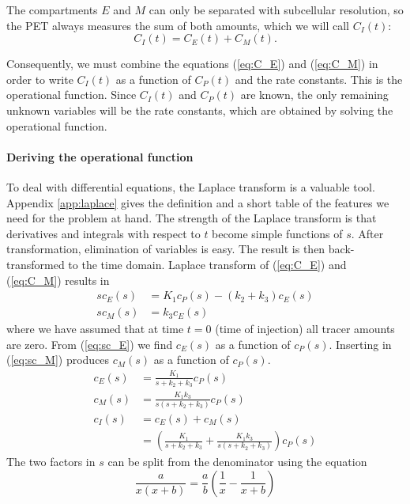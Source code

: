 \documentclass[11pt,oneside]{article}
\begin{document}
The compartments $E$ and $M$ can only be separated with subcellular
resolution, so the PET always measures the sum of both amounts, which we will
call $C_I(t)$:
\begin{equation}
  C_I(t) = C_E(t) + C_M(t).
\end{equation}

Consequently, we must combine the equations (\ref{eq:C_E}) and (\ref{eq:C_M})
in order to write $C_I(t)$ as a function of $C_P(t)$ and the rate
constants. This is the operational function. Since $C_I(t)$ and $C_P(t)$ are
known, the only remaining unknown variables will be the rate constants, which
are obtained by solving the operational function.

\paragraph{Deriving the operational function\\}
To deal with differential equations, the Laplace transform is a valuable
tool. Appendix \ref{app:laplace} gives the definition and a short table of the
features we need for the problem at hand. The strength of the Laplace
transform is that derivatives and integrals with respect to $t$ become simple
functions of $s$. After transformation, elimination of variables is easy. The
result is then back-transformed to the time domain.  Laplace transform of
(\ref{eq:C_E}) and (\ref{eq:C_M}) results in
\begin{align}
  s c_E(s) &= K_1 c_P(s) - (k_2 + k_3) c_E(s) \label{eq:sc_E}\\
  s c_M(s) &= k_3 c_E(s)  \label{eq:sc_M}
\end{align}
where we have assumed that at time $t=0$ (time of injection) all tracer
amounts are zero.  From (\ref{eq:sc_E}) we find $c_E(s)$ as a function of
$c_P(s)$. Inserting in (\ref{eq:sc_M}) produces $c_M(s)$ as a function of
$c_P(s)$.
\begin{align}
  c_E(s) &= \frac{K_1}{s + k_2 + k_3} c_P(s)\\
  c_M(s) &= \frac{K_1 k_3}{s (s + k_2 + k_3)} c_P(s)\\
  c_I(s) &= c_E(s) + c_M(s) \\
         &= \left( \frac{K_1}{s + k_2 + k_3} 
                    + \frac{K_1 k_3}{s (s + k_2 + k_3)}\right) c_P(s)
           \label{eq:c_I}
\end{align}
The two factors in $s$ can be split from the denominator using the equation
\begin{equation}
  \frac{a}{x(x + b)} = \frac{a}{b} \left( \frac{1}{x} - \frac{1}{x+b} \right)
\end{equation}
\end{document}
